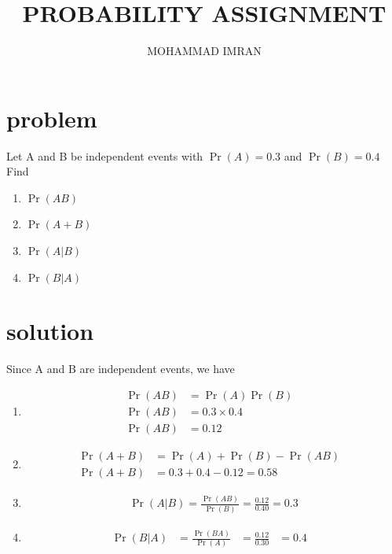 \documentclass[journal,12pt,twocolumn]{article}
\title{PROBABILITY ASSIGNMENT}
\author{MOHAMMAD IMRAN}
\providecommand{\pr}[1]{\ensuremath{\Pr\left(#1\right)}}
\begin{document}
\maketitle
\bigskip

\section{problem }

Let A and B be independent events with $\pr{A}=0.3$ and $\pr{B}=0.4$ Find 
\begin{enumerate}

\item$\pr{AB}$
\item$\pr{A+B}$ 
\item$\pr{A | B}$   
\item$\pr{B | A}$
       \end{enumerate}
\section{solution }  


Since A and B are independent events, we have 

\begin{enumerate}

\item \begin{align}
 \pr{AB}&=\pr{A} \pr{B}&\\
\pr{AB}&=0.3 \times 0.4&\\
\pr{AB}&=0.12&
\end{align}
\item \begin{align}
\pr{A+B}&=\pr{A}+\pr{B}-\pr{AB}&\\
\pr{A+B}&=0.3+0.4-0.12=0.58&
\end{align}
\item \begin{align}
\pr{A|B}=\frac{\pr{AB}}{\pr{B}}=\frac{0.12}{0.40}=0.3
\end{align}
\item \begin{align}
\pr{B|A}&=\frac{\pr{BA}}{\pr{A}}&=\frac{0.12}{0.30}&=0.4&
\end{align}
\end{enumerate}
\end{document}
